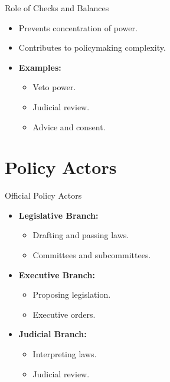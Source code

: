 \documentclass[12pt]{beamer}
\begin{document}
\begin{frame}{Role of Checks and Balances}
    \begin{itemize}
        \item Prevents concentration of power.
        \item Contributes to policymaking complexity.
        \item \textbf{Examples:}
        \begin{itemize}
            \item Veto power.
            \item Judicial review.
            \item Advice and consent.
        \end{itemize}
    \end{itemize}
\end{frame}

\section{Policy Actors}
\begin{frame}{Official Policy Actors}
    \begin{itemize}
        \item \textbf{Legislative Branch:}
        \begin{itemize}
            \item Drafting and passing laws.
            \item Committees and subcommittees.
        \end{itemize}
        \item \textbf{Executive Branch:}
        \begin{itemize}
            \item Proposing legislation.
            \item Executive orders.
        \end{itemize}
        \item \textbf{Judicial Branch:}
        \begin{itemize}
            \item Interpreting laws.
            \item Judicial review.
        \end{itemize}
    \end{itemize}
\end{frame}
\end{document}
